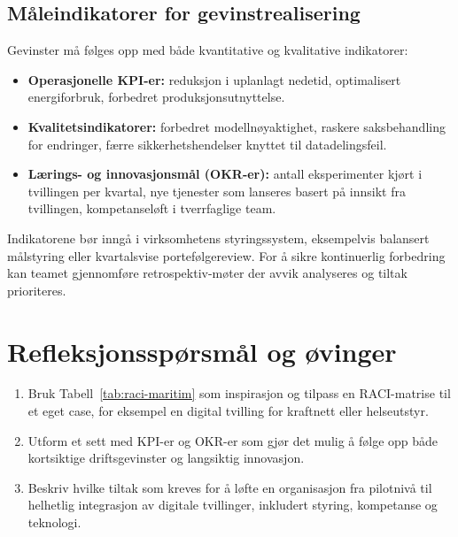 \subsection*{Måleindikatorer for gevinstrealisering}
Gevinster må følges opp med både kvantitative og kvalitative indikatorer:
\begin{itemize}
    \item \textbf{Operasjonelle KPI-er:} reduksjon i uplanlagt nedetid, optimalisert energiforbruk, forbedret produksjonsutnyttelse.
    \item \textbf{Kvalitetsindikatorer:} forbedret modellnøyaktighet, raskere saksbehandling for endringer, færre sikkerhetshendelser knyttet til datadelingsfeil.
    \item \textbf{Lærings- og innovasjonsmål (OKR-er):} antall eksperimenter kjørt i tvillingen per kvartal, nye tjenester som lanseres basert på innsikt fra tvillingen, kompetanseløft i tverrfaglige team.
\end{itemize}
Indikatorene bør inngå i virksomhetens styringssystem, eksempelvis balansert målstyring eller kvartalsvise portefølgereview. For å sikre kontinuerlig forbedring kan teamet gjennomføre retrospektiv-møter der avvik analyseres og tiltak prioriteres.

\section{Refleksjonsspørsmål og øvinger}
\begin{enumerate}
    \item Bruk Tabell~\ref{tab:raci-maritim} som inspirasjon og tilpass en RACI-matrise til et eget case, for eksempel en digital tvilling for kraftnett eller helseutstyr.
    \item Utform et sett med KPI-er og OKR-er som gjør det mulig å følge opp både kortsiktige driftsgevinster og langsiktig innovasjon.
    \item Beskriv hvilke tiltak som kreves for å løfte en organisasjon fra pilotnivå til helhetlig integrasjon av digitale tvillinger, inkludert styring, kompetanse og teknologi.
\end{enumerate}
